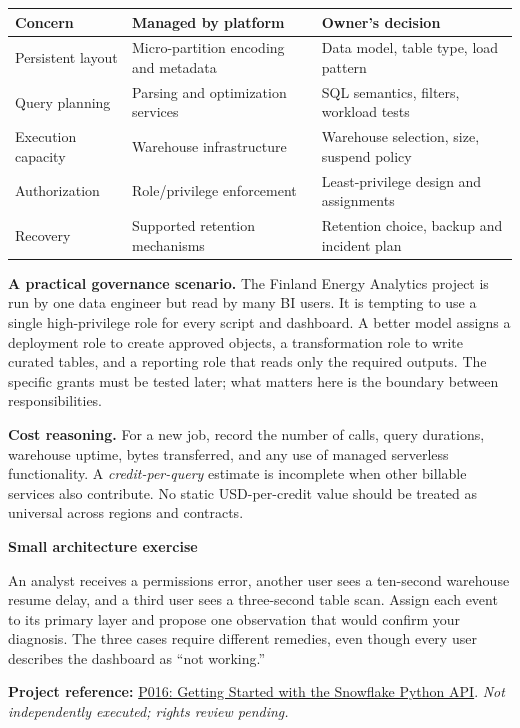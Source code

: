 \documentclass[11pt,twoside]{article}
\newcommand{\repo}[2]{\par\begingroup\fontsize{8.0}{9.6}\selectfont\sffamily\color{inkgray}\textbf{Project reference:} \href{#2}{#1}. \textit{Not independently executed; rights review pending.}\par\endgroup}
\begin{document}
\begin{center}\small
\begin{tabularx}{\linewidth}{@{}p{29mm}X X@{}}\toprule
\textbf{Concern} & \textbf{Managed by platform} & \textbf{Owner's decision}\\\midrule
Persistent layout & Micro-partition encoding and metadata & Data model, table type, load pattern\\
Query planning & Parsing and optimization services & SQL semantics, filters, workload tests\\
Execution capacity & Warehouse infrastructure & Warehouse selection, size, suspend policy\\
Authorization & Role/privilege enforcement & Least-privilege design and assignments\\
Recovery & Supported retention mechanisms & Retention choice, backup and incident plan\\
\bottomrule\end{tabularx}\end{center}

\textbf{A practical governance scenario.} The Finland Energy Analytics project is run by one data engineer but read by many BI users. It is tempting to use a single high-privilege role for every script and dashboard. A better model assigns a deployment role to create approved objects, a transformation role to write curated tables, and a reporting role that reads only the required outputs. The specific grants must be tested later; what matters here is the boundary between responsibilities.

\textbf{Cost reasoning.} For a new job, record the number of calls, query durations, warehouse uptime, bytes transferred, and any use of managed serverless functionality. A \emph{credit-per-query} estimate is incomplete when other billable services also contribute. No static USD-per-credit value should be treated as universal across regions and contracts.

\begin{whitebox}
\textbf{Small architecture exercise}\par
An analyst receives a permissions error, another user sees a ten-second warehouse resume delay, and a third user sees a three-second table scan. Assign each event to its primary layer and propose one observation that would confirm your diagnosis. The three cases require different remedies, even though every user describes the dashboard as ``not working.''
\end{whitebox}
\repo{P016: Getting Started with the Snowflake Python API}{https://github.com/Snowflake-Labs/sfguide-getting-started-snowflake-python-api}
\end{document}
